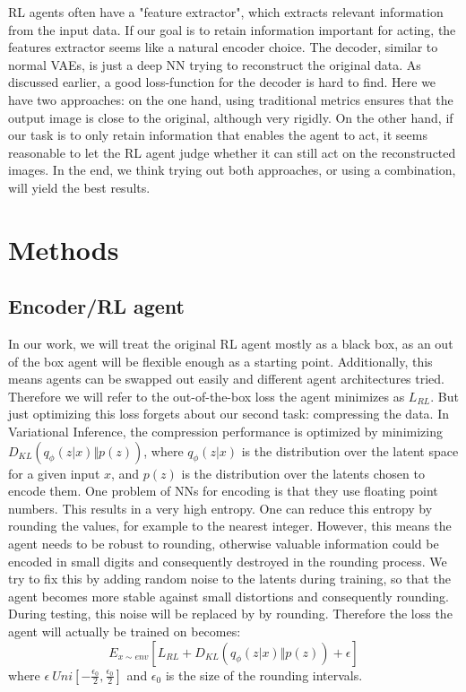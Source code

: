 \documentclass[a4paper]{scrartcl}
\begin{document}
    RL agents often have a "feature extractor",
    which extracts relevant information from the input data. If our goal is to
    retain information important for acting, the features extractor
    seems like a natural encoder choice. The decoder, similar to
    normal VAEs, is just a deep NN trying to
    reconstruct the original data. As discussed earlier, a good
    loss-function for the decoder is hard to find. Here we have two
    approaches: on the one hand, using traditional metrics ensures that the
    output image is close to the original, although very rigidly. On the other hand, if our task is to only retain information that
    enables the agent to act, it seems reasonable to let the RL
    agent judge whether it can still act on the reconstructed images. In the end,
    we think trying out both approaches, or using a combination, will yield the
    best results.

\section{Methods}
    \subsection{Encoder/RL agent}
        In our work, we will treat the original RL agent mostly as a black box, as an out of the box
        agent will be flexible enough as a starting point. Additionally, this means
        agents can be swapped out easily and different agent architectures tried. Therefore we will refer to the out-of-the-box loss the agent
        minimizes as $L_{RL}$. But just optimizing this loss
        forgets about our second task: compressing the data. In
        Variational Inference, the compression performance is optimized by
        minimizing $D_{KL} (q_\phi (z\vert x) \Vert p(z))$, where $q_\phi
        (z\vert x)$ is the distribution over the latent space for a given input
        $x$, and $p(z)$ is the distribution over the latents chosen to encode them.
        One problem of NNs for encoding is that they use
        floating point numbers. This results in a very high entropy. One can reduce this entropy by rounding
        the values, for example to the nearest integer. However, this means the
        agent needs to be robust to rounding, otherwise  valuable information could be encoded in small digits
        and consequently destroyed in the rounding process. We try to
        fix this by adding random noise to the latents during
        training, so that the agent becomes more stable against small
        distortions and consequently rounding. During testing, this
        noise will be replaced by by rounding. Therefore the loss the agent will actually be trained on becomes:
        \begin{equation}
            E_{x \sim env} [L_{RL} + D_{KL} (q_\phi (z\vert x) \Vert p(z)) + \epsilon]
        \end{equation}
        where $\epsilon ~ Uni[-\frac{\epsilon_0}{2}, \frac{\epsilon_0}{2}]$ and $\epsilon_0$ is the size of the rounding intervals.
\end{document}
